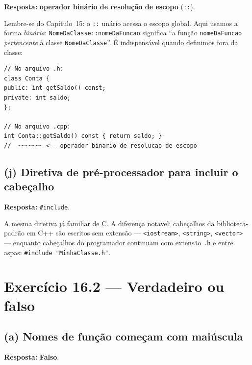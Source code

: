 \documentclass[11pt,a4paper]{article}
\begin{document}
\begin{resposta}\textbf{Resposta:} \textbf{operador bin\'ario de resolu\c{c}\~ao de escopo} (\texttt{::}).\end{resposta}

Lembre-se do Cap\'itulo~15: o \texttt{::} un\'ario acessa o escopo global. Aqui usamos a forma \emph{bin\'aria}: \texttt{NomeDaClasse::nomeDaFuncao} significa ``a fun\c{c}\~ao \texttt{nomeDaFuncao} \emph{pertencente} \`a classe \texttt{NomeDaClasse}''. \'E indispens\'avel quando definimos fora da classe:

\begin{lstlisting}[style=cppcode,numbers=none]
// No arquivo .h:
class Conta {
public: int getSaldo() const;
private: int saldo;
};

// No arquivo .cpp:
int Conta::getSaldo() const { return saldo; }
//  ~~~~~~~ <-- operador binario de resolucao de escopo
\end{lstlisting}

\subsection*{(j) Diretiva de pr\'e-processador para incluir o cabe\c{c}alho}

\begin{resposta}\textbf{Resposta:} \texttt{\#include}.\end{resposta}

A mesma diretiva j\'a familiar de C. A diferen\c{c}a notavel: cabe\c{c}alhos da biblioteca-padr\~ao em C++ s\~ao escritos sem extens\~ao --- \texttt{<iostream>}, \texttt{<string>}, \texttt{<vector>} --- enquanto cabe\c{c}alhos do programador continuam com extens\~ao \texttt{.h} e entre aspas: \texttt{\#include "MinhaClasse.h"}.

\section{Exerc\'icio 16.2 --- Verdadeiro ou falso}

\subsection*{(a) Nomes de fun\c{c}\~ao come\c{c}am com mai\'uscula}

\begin{resposta}\textbf{Resposta:} \textbf{Falso}.\end{resposta}
\end{document}
